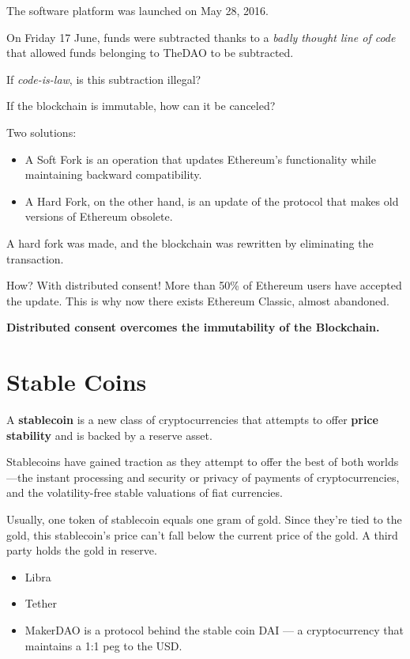 The software platform was launched on May 28, 2016.

On Friday 17 June, funds were subtracted thanks to a \textit{badly thought line of code} that allowed funds belonging to TheDAO to be subtracted.

If \textit{code-is-law}, is this subtraction illegal?

If the blockchain is immutable, how can it be canceled?

Two solutions:
\begin{itemize}
	\item A Soft Fork is an operation that updates Ethereum's functionality while maintaining backward compatibility.
	\item A Hard Fork, on the other hand, is an update of the protocol that makes old versions of Ethereum obsolete.
\end{itemize}

A hard fork was made, and the blockchain was rewritten by eliminating the transaction.

How? With distributed consent! More than 50\% of Ethereum users have accepted the update. This is why now there exists Ethereum Classic, almost abandoned.

\textbf{Distributed consent overcomes the immutability of the Blockchain.}
\section{Stable Coins}




A \textbf{stablecoin} is a new class of cryptocurrencies that attempts to offer \textbf{price stability} and is backed by a reserve asset. 

Stablecoins have gained traction as they attempt to offer the best of both worlds—the instant processing and security or privacy of payments of cryptocurrencies, and the volatility-free stable valuations of fiat currencies.

Usually, one token of stablecoin equals one gram of gold. Since they’re tied to the gold, this stablecoin’s price can’t fall below the current price of the gold. A third party holds the gold in reserve.

\begin{itemize}
	\item Libra
	\item Tether
	\item MakerDAO is a protocol behind the stable coin DAI — a cryptocurrency that maintains a 1:1 peg to the USD. 
\end{itemize}


